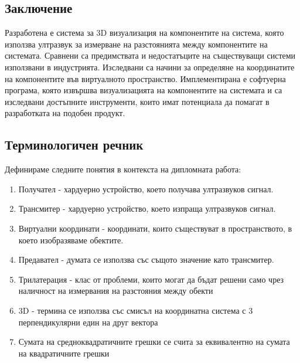 \subsection{Заключение}
Разработена е система за 3D визуализация на компонентите на система, която използва ултразвук за измерване на разстоянията между компонентите на системата. Сравнени са предимствата и недостатъците на съществуващи системи използвани в индустрията. Изследвани са начини за определяне на координатите на компонентите във виртуалното пространство. Имплементирана е софтуерна програма, която извършва визуализацията на компонентите на системата и са изследвани достъпните инструменти, които имат потенциала да помагат в разработката на подобен продукт.



\subsection{Терминологичен речник}
Дефинираме следните понятия в контекста на дипломната работа:
\begin{enumerate}
    \item Получател - хардуерно устройство, което получава ултразвуков сигнал.
    \item Трансмитер - хардуерно устройство, което изпраща ултразвуков сигнал.
    \item Виртуални координати - координати, които съществуват в пространството, в което изобразяваме обектите.
    \item Предавател - думата се използва със същото значение като трансмитер.
    \item Трилатерация - клас от проблеми, които могат да бъдат решени само чрез наличност на измервания на разстояния между обекти \cite{murphy}
    \item 3D - термина се използва със смисъл на координатна система с 3 перпендикулярни един на друг вектора
    \item Сумата на средноквадратичните грешки се счита за еквивалентно на сумата на квадратичните грешки
\end{enumerate}
